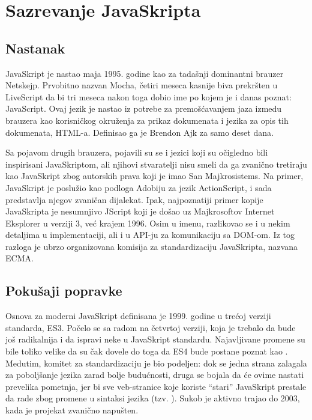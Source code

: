 \section{Sazrevanje JavaSkripta}

\subsection{Nastanak}

JavaSkript je nastao maja 1995. godine kao  za tadašnji dominantni brauzer Netskejp.
Prvobitno nazvan Mocha, četiri meseca kasnije biva prekršten u LiveScript da bi tri meseca nakon toga dobio ime po kojem je i danas poznat: JavaScript.
Ovaj jezik je nastao iz potrebe za premošćavanjem jaza izmedu brauzera kao korisničkog okruženja za prikaz dokumenata i jezika za opis tih dokumenata, HTML-a. 
Definisao ga je Brendon Ajk za samo deset dana.

Sa pojavom drugih brauzera, pojavili su se i jezici koji su očigledno bili inspirisani JavaSkriptom, ali njihovi stvaratelji nisu smeli da ga zvanično tretiraju kao JavaSkript zbog autorskih prava koji je imao San Majkrosistems.
Na primer, JavaSkript je poslužio kao podloga Adobiju za jezik ActionScript, i sada predstavlja njegov zvaničan dijalekat.
Ipak, najpoznatiji primer kopije JavaSkripta je nesumnjivo JScript koji je došao uz Majkrosoftov Internet Eksplorer u verziji 3, već krajem 1996.
Osim u imenu, razlikovao se i u nekim detaljima u implementaciji, ali i u API-ju za komunikaciju sa DOM-om.
Iz tog razloga je ubrzo organizovana komisija za standardizaciju JavaSkripta, nazvana ECMA.

\subsection{Pokušaji popravke}

Osnova za moderni JavaSkript definisana je 1999. godine u trećoj verziji standarda, ES3.
Počelo se sa radom na četvrtoj verziji, koja je trebalo da bude još radikalnija i da ispravi neke  u JavaSkript standardu.
Najavljivane promene su bile toliko velike da su čak dovele do toga da ES4 bude postane poznat kao .
Medutim, komitet za standardizaciju je bio podeljen: dok se jedna strana zalagala za poboljšanje jezika zarad bolje budućnosti, druga se bojala da će ovime nastati prevelika pometnja, jer bi sve veb-stranice koje koriste “stari” JavaSkript prestale da rade zbog promene u sintaksi jezika (tzv. ).
Sukob je aktivno trajao do 2003, kada je projekat zvanično napušten.

